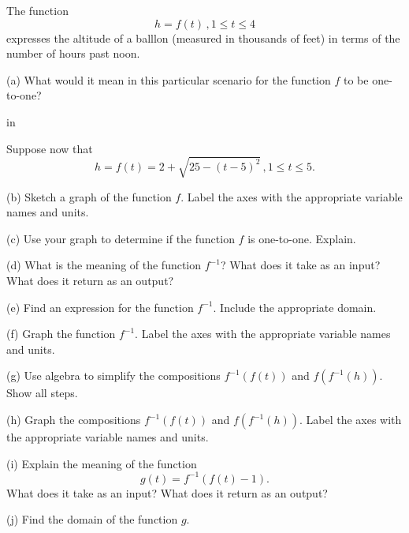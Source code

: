 \documentclass{ximera}
\newcommand{\pskip}{\vskip 0.1 in}
\begin{document}
\begin{exercise}  \label{E:dsf4ttmb}
The function
\[
    h = f(t) \, , 1\leq t \leq 4
\]
expresses the altitude of a balllon (measured in thousands of feet) in terms of the number of hours past noon.

(a) What would it mean in this particular scenario for the function $f$ to be one-to-one?

\pskip

Suppose now that 
\[
    h = f(t) = 2 + \sqrt{25-(t-5)^2} \, , 1\leq t \leq 5.
\]

(b) Sketch a graph of the function $f$. Label the axes with the appropriate variable names and units.

(c) Use your graph to determine if the function $f$ is one-to-one. Explain.

(d) What is the meaning of the function $f^{-1}$? What does it take as an input? What does it return as an output?

(e) Find an expression for the function $f^{-1}$. Include the appropriate domain.

(f) Graph the function $f^{-1}$. Label the axes with the appropriate variable names and units.

(g) Use algebra to simplify the compositions $f^{-1}(f(t))$ and $f(f^{-1}(h))$. Show all steps.

(h) Graph the compositions $f^{-1}(f(t))$ and $f(f^{-1}(h))$. Label the axes with the appropriate variable names and units.

(i) Explain the meaning of the function
\[
      g(t)=f^{-1}(f(t)-1) .
\]
What does it take as an input? What does it return as an output?

(j) Find the domain of the function $g$. 

\end{exercise}
\end{document}
